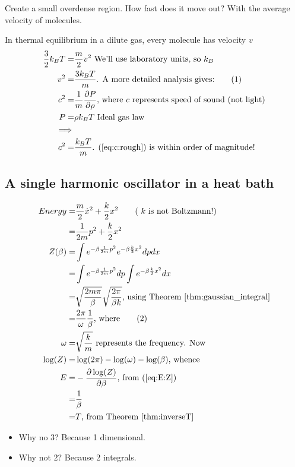 \documentclass[]{article}
\newcommand\numberthis{\addtocounter{equation}{1}\tag{\theequation}}
\begin{document}
Create a small overdense region. How fast does it move out? With the average velocity of molecules.

In thermal equilibrium in a dilute gas, every molecule has velocity $v$
\begin{align*}
\frac{3}{2} k_B T =& \frac{m}{2} v^2\text{ We'll use laboratory units, so $k_B$}\\
v^2 =& \frac{3 k_B T}{m}\text{. A more detailed analysis gives:} \numberthis \label{eq:c:rough}\\
c^2 =& \frac{1}{m}\frac{\partial P}{\partial \rho} \text{, where $c$ represents speed of sound (not light)}\\
P =& \rho k_B T\text{ Ideal gas law}\\
\implies&\\
c^2 =& \frac{k_B T}{m}\text{. (\ref{eq:c:rough}) is within order of magnitude!}
\end{align*}


\subsection{A single harmonic oscillator in a heat bath}

\begin{align*}
Energy =& \frac{m}{2} \dot{x}^ 2 + \frac{k}{2} x^2\tag{ $k$ is not Boltzmann!}\\
=& \frac{1}{2m} p^ 2 + \frac{k}{2} x^2\\
Z(\beta) =& \int e^{-\beta \frac{1}{2m} p^ 2 } e^{-\beta \frac{k}{2} x^2} dp dx\\
=& \int e^{-\beta \frac{1}{2m} p^ 2 } dp \int e^{-\beta \frac{k}{2} x^2} dx\\
=& \sqrt{\frac{2m\pi}{\beta}}\sqrt{\frac{2 \pi}{\beta k}} \text{, using Theorem \ref{thm:gaussian_integral}}\\
=& \frac{2 \pi}{\omega}\frac{1}{\beta}\text{, where} \numberthis\label{eq:Z:classical:q}\\
\omega =& \sqrt{\frac{k}{m}} \text{ represents the frequency. Now}\\
\log(Z) =& \log(2\pi) -\log(\omega) - \log(\beta)\text{, whence }\\
E =& - \frac{\partial \log(Z)}{\partial \beta}\text{, from (\ref{eq:E:Z})}\\
=& \frac{1}{\beta}\\
=& T \text{, from Theorem \ref{thm:inverseT}}
\end{align*}

\begin{itemize}
	\item Why no 3? Because 1 dimensional.
	\item Why not 2? Because 2 integrals.
\end{itemize}
\end{document}
